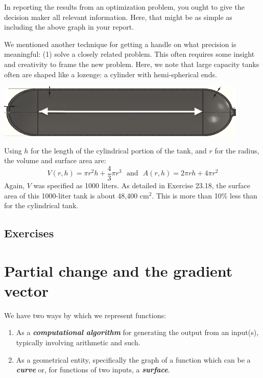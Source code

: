 \documentclass[
  letterpaper,
  DIV=11,
  numbers=noendperiod,
  oneside]{scrreprt}
\providecommand{\tightlist}{%
  \setlength{\itemsep}{0pt}\setlength{\parskip}{0pt}}
\begin{document}
In reporting the results from an optimization problem, you ought to give
the decision maker all relevant information. Here, that might be as
simple as including the above graph in your report.

We mentioned another technique for getting a handle on what precision is
meaningful: (1) solve a closely related problem. This often requires
some insight and creativity to frame the new problem. Here, we note that
large capacity tanks often are shaped like a lozenge: a cylinder with
hemi-spherical ends.

\begin{marginfigure}

{\centering \includegraphics[width=0.9\textwidth,height=\textheight]{Differentiation/www/hemisphere.png}

}

\end{marginfigure}

Using \(h\) for the length of the cylindrical portion of the tank, and
\(r\) for the radius, the volume and surface area are:
\[V(r, h) = \pi r^2 h + \frac{4}{3} \pi r^3 \ \ \ \text{and}\ \ \ A(r,h) = 2 \pi r h + 4 \pi r^2\]
Again, \(V\) was specified as 1000 liters. As detailed in Exercise
23.18, the surface area of this 1000-liter tank is about 48,400
cm\(^2\). This is more than 10\% less than for the cylindrical tank.

\hypertarget{exercises-7}{%
\section{Exercises}\label{exercises-7}}

\hypertarget{sec-partial-change}{%
\chapter{Partial change and the gradient
vector}\label{sec-partial-change}}

We have two ways by which we represent functions:

\begin{enumerate}
\def\labelenumi{\arabic{enumi}.}
\tightlist
\item
  As a \textbf{\emph{computational algorithm}} for generating the output
  from an input(s), typically involving arithmetic and such.
\item
  As a geometrical entity, specifically the graph of a function which
  can be a \textbf{\emph{curve}} or, for functions of two inputs, a
  \textbf{\emph{surface}}.
\end{enumerate}
\end{document}
